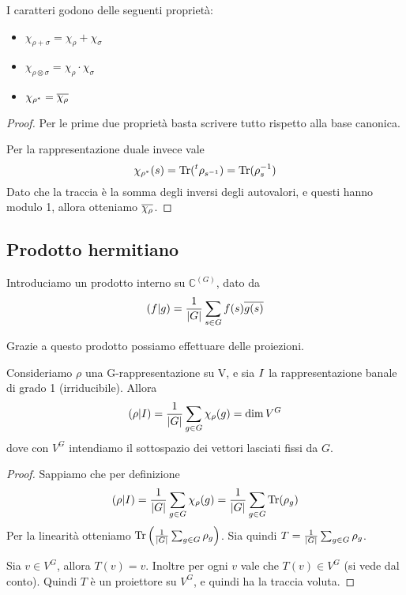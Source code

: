 \begin{mylemma}
I caratteri godono delle seguenti proprietà:
  \begin{itemize}
  \item $\chi_{\rho+\sigma}=\chi_\rho+\chi_\sigma$     
  \item $\chi_{\rho\otimes\sigma}=\chi_\rho\cdot\chi_\sigma$
  \item $\chi_{\rho^*} = \overline{\chi_\rho}$
  \end{itemize}
\end{mylemma}
\begin{proof}
	Per le prime due proprietà basta scrivere tutto rispetto alla base canonica.
	
  Per la rappresentazione duale invece vale 
  \[
		\chi_{\rho^*}(s)=\operatorname{Tr} (\prescript{t}{}{\rho}_{s^{-1}})=\operatorname{Tr} (\rho_s^{-1})
  \]
  Dato che la traccia è la somma degli inversi degli autovalori, e questi hanno modulo 1, allora otteniamo $\overline{\chi_\rho}$. 

\end{proof}

\subsection{Prodotto hermitiano}
Introduciamo un prodotto interno su $\mathbb C^{(G)}$, dato da 
\[
  \left(f | g\right) = \frac 1{\left|G\right|} \sum_{s\in G} f(s)\overline{g(s)}
\]

Grazie a questo prodotto possiamo effettuare delle proiezioni.

\begin{mylemma}
  Consideriamo $\rho$ una G-rappresentazione su V, e sia $I$ la rappresentazione banale di grado 1 (irriducibile). Allora 
  \[
  \left(\rho | I\right) = \frac 1{\left|G\right|}\sum_{g\in G} \chi_\rho(g) = \dim V^G
  \]    
  dove con $V^G$ intendiamo il sottospazio dei vettori lasciati fissi da $G$.
\end{mylemma}
\begin{proof}
  Sappiamo che per definizione
  \[
  \left(\rho | I\right) = \frac 1{\left|G\right|}\sum_{g\in G} \chi_\rho(g) = \frac 1{\left|G\right|}\sum_{g\in G} \operatorname{Tr}(\rho_g) 
  \]
  Per la linearità otteniamo $\operatorname{Tr}\left(\frac 1{\left|G\right|}\sum_{g\in G}\rho_g\right)$. Sia quindi $T=\frac 1{\left|G\right|}\sum_{g\in G}\rho_g$.
  
  Sia $v \in V^G$, allora $T(v)=v$. Inoltre per ogni $v$ vale che $T(v) \in V^G$ (si vede dal conto). Quindi $T$ è un proiettore su $V^G$, e quindi ha la traccia voluta.
  
\end{proof}

